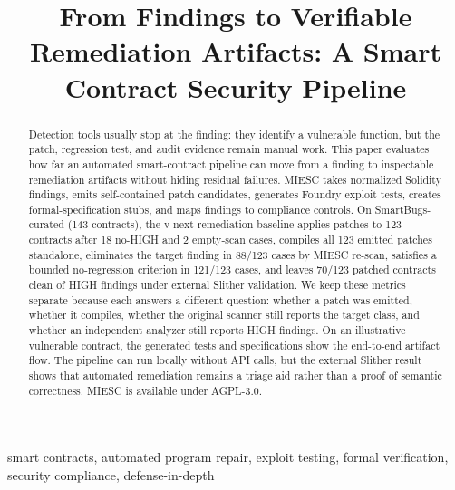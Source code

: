 \documentclass[conference]{IEEEtran}
\begin{document}
\title{From Findings to Verifiable Remediation Artifacts: A Smart Contract Security Pipeline}

\author{
}

\maketitle

\begin{abstract}
Detection tools usually stop at the finding: they identify a vulnerable function, but the patch, regression test, and audit evidence remain manual work. This paper evaluates how far an automated smart-contract pipeline can move from a finding to inspectable remediation artifacts without hiding residual failures. MIESC takes normalized Solidity findings, emits self-contained patch candidates, generates Foundry exploit tests, creates formal-specification stubs, and maps findings to compliance controls. On SmartBugs-curated (143 contracts), the v-next remediation baseline applies patches to 123 contracts after 18 no-HIGH and 2 empty-scan cases, compiles all 123 emitted patches standalone, eliminates the target finding in 88/123 cases by MIESC re-scan, satisfies a bounded no-regression criterion in 121/123 cases, and leaves 70/123 patched contracts clean of HIGH findings under external Slither validation. We keep these metrics separate because each answers a different question: whether a patch was emitted, whether it compiles, whether the original scanner still reports the target class, and whether an independent analyzer still reports HIGH findings. On an illustrative vulnerable contract, the generated tests and specifications show the end-to-end artifact flow. The pipeline can run locally without API calls, but the external Slither result shows that automated remediation remains a triage aid rather than a proof of semantic correctness. MIESC is available under AGPL-3.0.
\end{abstract}

\begin{IEEEkeywords}
smart contracts, automated program repair, exploit testing, formal verification, security compliance, defense-in-depth
\end{IEEEkeywords}
\end{document}
